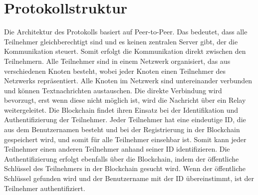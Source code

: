 \section{Protokollstruktur}
\label{sec:protokolldesign_und_struktur}




Die Architektur des Protokolls basiert auf Peer-to-Peer. Das bedeutet, dass alle Teilnehmer gleichberechtigt sind und es keinen zentralen Server gibt, der die Kommunikation steuert. Somit erfolgt die Kommunikation direkt zwischen den Teilnehmern. Alle Teilnehmer sind in einem Netzwerk organisiert, das aus verschiedenen Knoten besteht, wobei jeder Knoten einen Teilnehmer des Netzwerks repräsentiert. Alle Knoten im Netzwerk sind untereinander verbunden und können Textnachrichten austauschen. Die direkte Verbindung wird bevorzugt, erst wenn diese nicht möglich ist, wird die Nachricht über ein Relay weitergeleitet. Die Blockchain findet ihren Einsatz bei der Identifikation und Authentifizierung der Teilnehmer. Jeder Teilnehmer hat eine eindeutige ID, die aus dem Benutzernamen besteht und bei der Registrierung in der Blockchain gespeichert wird, und somit für alle Teilnehmer einsehbar ist. Somit kann jeder Teilnehmer einen anderen Teilnehmer anhand seiner ID identifizieren. Die Authentifizierung erfolgt ebenfalls über die Blockchain, indem der öffentliche Schlüssel des Teilnehmers in der Blockchain gesucht wird. Wenn der öffentliche Schlüssel gefunden wird und der Benutzername mit der ID übereinstimmt, ist der Teilnehmer authentifiziert.

